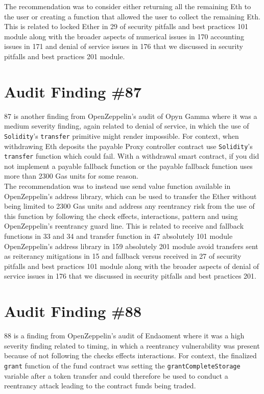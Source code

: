 The recommendation was to consider either returning all the remaining Eth to the user or creating a function that allowed the user to collect the remaining Eth. This is related to locked Ether in 29 of security pitfalls and best practices 101 module along with the broader aspects of numerical issues in 170 accounting issues in 171 and denial of service issues in 176 that we discussed in security pitfalls and best practices 201 module.

\section{Audit Finding \#87}

87 is another finding from OpenZeppelin's audit of Opyn Gamma where it was a medium severity finding, again related to denial of service, in which the use of \verb|Solidity|'s \verb|transfer| primitive might render impossible. For context, when withdrawing Eth deposits the payable Proxy controller contract use \verb|Solidity|'s \verb|transfer| function which could fail. With a withdrawal smart contract, if you did not implement a payable fallback function or the payable fallback function uses more than 2300 Gas units for some reason.\\

The recommendation was to instead use send value function available in OpenZeppelin's address library, which can be used to transfer the Ether without being limited to 2300 Gas units and address any reentrancy risk from the use of this function by following the check effects, interactions, pattern and using OpenZeppelin's reentrancy guard line. This is related to receive and fallback functions in 33 and 34 and transfer function in 47 absolutely 101 module OpenZeppelin's address library in 159 absolutely 201 module avoid transfers sent as reiterancy mitigations in 15 and fallback versus received in 27 of security pitfalls and best practices 101 module along with the broader aspects of denial of service issues in 176 that we discussed in security pitfalls and best practices 201.

\section{Audit Finding \#88}

88 is a finding from OpenZeppelin's audit of Endaoment where it was a high severity finding related to timing, in which a reentrancy vulnerability was present because of not following the checks effects interactions. For context, the finalized \verb|grant| function of the fund contract was setting the \verb|grantCompleteStorage| variable after a token transfer and could therefore be used to conduct a reentrancy attack leading to the contract funds being traded.\\


